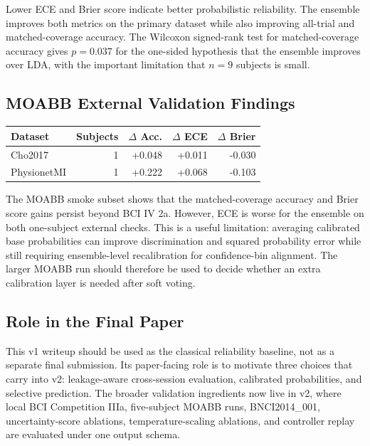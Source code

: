 \documentclass[11pt]{article}
\begin{document}
Lower ECE and Brier score indicate better probabilistic reliability. The
ensemble improves both metrics on the primary dataset while also improving
all-trial and matched-coverage accuracy. The Wilcoxon signed-rank test for
matched-coverage accuracy gives \(p = 0.037\) for the one-sided hypothesis
that the ensemble improves over LDA, with the important limitation that
\(n = 9\) subjects is small.

\subsection{MOABB External Validation Findings}

\begin{center}
\begin{tabular}{lrrrr}
\toprule
Dataset & Subjects & \(\Delta\) Acc. & \(\Delta\) ECE & \(\Delta\) Brier \\
\midrule
Cho2017 & 1 & +0.048 & +0.011 & -0.030 \\
PhysionetMI & 1 & +0.222 & +0.068 & -0.103 \\
\bottomrule
\end{tabular}
\end{center}

The MOABB smoke subset shows that the matched-coverage accuracy and Brier
score gains persist beyond BCI IV 2a. However, ECE is worse for the ensemble
on both one-subject external checks. This is a useful limitation: averaging
calibrated base probabilities can improve discrimination and squared
probability error while still requiring ensemble-level recalibration for
confidence-bin alignment. The larger MOABB run should therefore be used to
decide whether an extra calibration layer is needed after soft voting.

\subsection{Role in the Final Paper}

This v1 writeup should be used as the classical reliability baseline, not as a
separate final submission. Its paper-facing role is to motivate three choices
that carry into v2: leakage-aware cross-session evaluation, calibrated
probabilities, and selective prediction. The broader validation ingredients
now live in v2, where local BCI Competition IIIa, five-subject MOABB runs,
BNCI2014\_001, uncertainty-score ablations, temperature-scaling ablations, and
controller replay are evaluated under one output schema.
\end{document}
